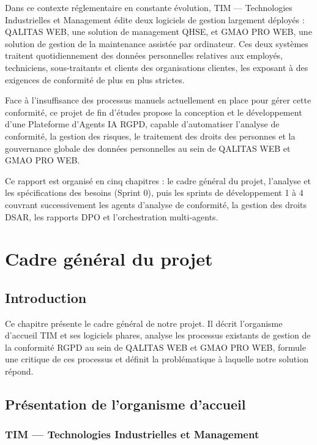 \documentclass[12pt,a4paper]{report}
\begin{document}
Dans ce contexte réglementaire en constante évolution, TIM --- Technologies Industrielles et Management édite deux logiciels de gestion largement déployés : QALITAS WEB, une solution de management QHSE, et GMAO PRO WEB, une solution de gestion de la maintenance assistée par ordinateur. Ces deux systèmes traitent quotidiennement des données personnelles relatives aux employés, techniciens, sous-traitants et clients des organisations clientes, les exposant à des exigences de conformité de plus en plus strictes.

Face à l'insuffisance des processus manuels actuellement en place pour gérer cette conformité, ce projet de fin d'études propose la conception et le développement d'une Plateforme d'Agents IA RGPD, capable d'automatiser l'analyse de conformité, la gestion des risques, le traitement des droits des personnes et la gouvernance globale des données personnelles au sein de QALITAS WEB et GMAO PRO WEB.

Ce rapport est organisé en cinq chapitres : le cadre général du projet, l'analyse et les spécifications des besoins (Sprint 0), puis les sprints de développement 1 à 4 couvrant successivement les agents d'analyse de conformité, la gestion des droits DSAR, les rapports DPO et l'orchestration multi-agents.

\chapter{Cadre général du projet}

\section{Introduction}

Ce chapitre présente le cadre général de notre projet. Il décrit l'organisme d'accueil TIM et ses logiciels phares, analyse les processus existants de gestion de la conformité RGPD au sein de QALITAS WEB et GMAO PRO WEB, formule une critique de ces processus et définit la problématique à laquelle notre solution répond.

\section{Présentation de l'organisme d'accueil}

\subsection{TIM --- Technologies Industrielles et Management}
\end{document}
